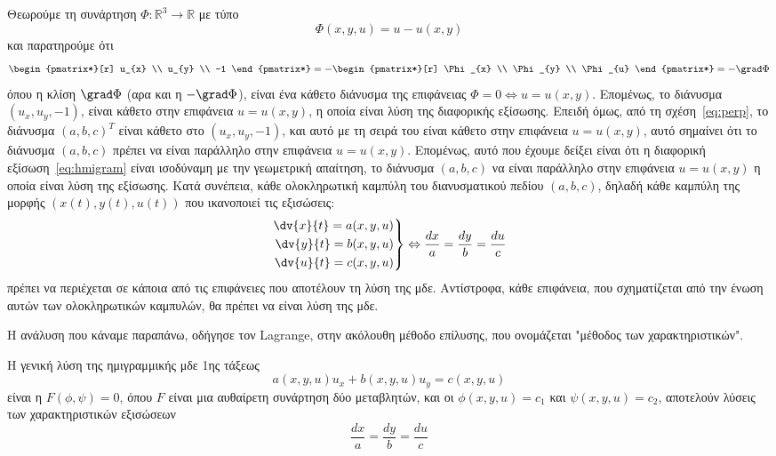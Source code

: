 \documentclass[a4paper,table]{report}
\begin{document}
Θεωρούμε τη συνάρτηση $ \Phi \colon \mathbb{R}^{3} \to \mathbb{R} $ με τύπο 
\[
  \Phi(x,y,u)=u-u(x,y) 
\] 
και παρατηρούμε ότι 
\[
  \begin{pmatrix*}[r] u_{x} \\ u_{y} \\ -1 \end{pmatrix*} = -
  \begin{pmatrix*}[r] \Phi _{x} \\ \Phi _{y} \\ \Phi _{u} \end{pmatrix*} = 
  - \grad \Phi 
\]
όπου η κλίση $ \grad \Phi $ (αρα και η $ - \grad \Phi $), είναι ένα κάθετο διάνυσμα 
της επιφάνειας $ \Phi = 0 \Leftrightarrow u=u(x,y) $. Επομένως, το διάνυσμα 
$ (u_{x},u_{y},-1) $, είναι κάθετο στην επιφάνεια $ u=u(x,y) $, η οποία είναι 
λύση της διαφορικής εξίσωσης.
Επειδή όμως, από τη σχέση~\eqref{eq:perp}, το διάνυσμα $ (a,b,c)^{T} $ 
είναι κάθετο στο $ (u_{x},u_{y},-1) $, και αυτό με τη σειρά του είναι κάθετο 
στην επιφάνεια $ u=u(x,y) $, αυτό σημαίνει ότι το διάνυσμα 
$ (a,b,c) $ πρέπει να είναι παράλληλο στην επιφάνεια $ u=u(x,y) $. Επομένως, 
αυτό που έχουμε δείξει είναι ότι η διαφορική εξίσωση~\eqref{eq:hmigram} είναι 
ισοδύναμη με την γεωμετρική απαίτηση, το διάνυσμα $ (a,b,c) $ να είναι παράλληλο
στην επιφάνεια $ u=u(x,y) $ η οποία είναι λύση της εξίσωσης. 
Κατά συνέπεια, κάθε ολοκληρωτική καμπύλη του διανυσματικού πεδίου $ (a,b,c) $,
δηλαδή κάθε καμπύλη της μορφής $ (x(t),y(t),u(t)) $ που ικανοποιεί τις εξισώσεις:
\[
  \left.
    \begin{aligned}
      \dv{x}{t} = a(x,y,u) \\
      \dv{y}{t} = b(x,y,u) \\
      \dv{u}{t} = c(x,y,u) 
    \end{aligned} 
  \right\} \Leftrightarrow 
  \frac{dx}{a} = \frac{dy}{b} = \frac{du}{c}
\]
πρέπει να περιέχεται σε κάποια από τις επιφάνειες που αποτέλουν τη λύση της μδε. 
Αντίστροφα, κάθε επιφάνεια, που σχηματίζεται από την ένωση αυτών των ολοκληρωτικών καμπυλών, θα πρέπει να είναι λύση της μδε.

Η ανάλυση που κάναμε παραπάνω, οδήγησε τον \textlatin{Lagrange,} στην ακόλουθη μέθοδο 
επίλυσης, που ονομάζεται "μέθοδος των χαρακτηριστικών". 

\begin{mybox2}
  \begin{thm}
    Η γενική λύση της ημιγραμμικής μδε 1ης τάξεως 
    \[
      a(x,y,u)u_{x} + b(x,y,u)u_{y} = c(x,y,u) 
    \] 
    είναι η $ F(\phi, \psi) = 0 $, όπου $F$ είναι μια αυθαίρετη συνάρτηση δύο μεταβλητών,
    και οι $ \phi (x,y,u) = c_{1} $ και $ \psi (x,y,u) = c_{2} $, αποτελούν λύσεις των 
    χαρακτηριστικών εξισώσεων
    \[
      \frac{dx}{a} = \frac{dy}{b} = \frac{du}{c} 
    \] 
  \end{thm}
\end{mybox2}

\end{document}
